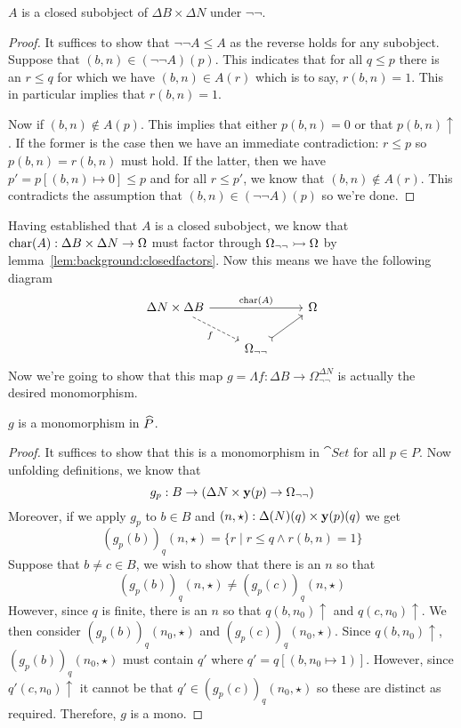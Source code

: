 \begin{lem}\label{lem:cohentopos:Aclosed}
  $A$ is a closed subobject of $\Delta B \times \Delta N$ under
  $\neg\neg$.
\end{lem}
\begin{proof}
  It suffices to show that $\neg\neg A \le A$ as the reverse holds for
  any subobject. Suppose that $(b, n) \in (\neg\neg A)(p)$. This
  indicates that for all $q \le p$ there is an $r \le q$ for which we
  have $(b, n) \in A(r)$ which is to say, $r(b, n) = 1$. This in
  particular implies that $r(b, n) = 1$.

  Now if $(b, n) \not\in A(p)$. This implies that either $p(b, n) = 0$
  or that $p(b, n) \uparrow$. If the former is the case then we have
  an immediate contradiction: $r \le p$ so $p(b, n) = r(b, n)$ must
  hold. If the latter, then we have $p' = p[(b, n) \mapsto 0] \le p$
  and for all $r \le p'$, we know that $(b, n) \not\in A(r)$. This
  contradicts the assumption that $(b, n) \in (\neg\neg A)(p)$ so
  we're done.
\end{proof}

Having established that $A$ is a closed subobject, we know that
$\operatorname{char}(A) : \Delta B \times \Delta N \to \Omega$ must factor
through $\Omega_{\neg\neg} \rightarrowtail \Omega$ by lemma~\ref{lem:background:closedfactors}.
Now this means we have the following diagram
\[
  \begin{tikzcd}
    {\Delta N \times \Delta B} \ar[rr, "\charmap(A)"]
    \ar[dr, "f", swap, dashed] & & \Omega\\
    & \Omega_{\neg\neg} \ar[ur, rightarrowtail]
  \end{tikzcd}
\]
Now we're going to show that this map
$g = \Lambda f : \Delta B \to \Omega_{\neg\neg}^{\Delta N}$ is
actually the desired monomorphism.
\begin{lem}
  $g$ is a monomorphism in $\widehat{P}$.
\end{lem}
\begin{proof}
  It suffices to show that this is a monomorphism in $\cat{Set}$ for
  all $p \in P$. Now unfolding definitions, we know that
  \[
    g_p : B \to (\Delta N \times \mathbf{y}(p) \to \Omega_{\neg\neg})
  \]
  Moreover, if we apply $g_p$ to $b \in B$ and
  $(n, \star) : \Delta(N)(q) \times \mathbf{y}(p)(q)$ we get
  \[
    (g_p(b))_q(n, \star) = \{r \mid r \le q \wedge r(b, n) = 1\}
  \]
  Suppose that $b \neq c \in B$, we wish to show that there is an $n$
  so that
  \[
    (g_p(b))_q(n, \star) \neq (g_p(c))_q(n, \star)
  \]
  However, since $q$ is finite, there is an $n$ so that
  $q(b, n_0) \uparrow$ and $q(c, n_0) \uparrow$. We then consider
  $(g_p(b))_q(n_0, \star)$ and $(g_p(c))_q(n_0, \star)$. Since
  $q(b, n_0) \uparrow$, $(g_p(b))_q(n_0, \star)$ must contain $q'$
  where $q' = q[(b, n_0 \mapsto 1)]$. However, since $q'(c, n_0)
  \uparrow$ it cannot be that $q' \in (g_p(c))_q(n_0, \star)$ so these
  are distinct as required. Therefore, $g$ is a mono.
\end{proof}


